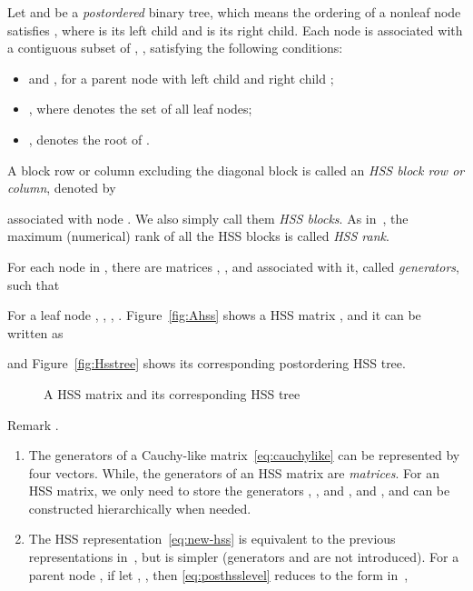 \documentclass[times]{nlaauth}
\newcounter{remark}
\newenvironment{remark}{\refstepcounter{remark}\vspace{1ex}
{\sc Remark \theremark.}\hspace{0.3em}\parindent=0pt}{\vspace{1ex}}
\begin{document}
Let  and
 be a \emph{postordered} binary tree, which means the ordering of a nonleaf node 
satisfies , where  is its left child and  is its right child.
Each node  is associated with a contiguous subset of , , satisfying the
following conditions:
\begin{itemize}
\item  and , for a parent node  with
  left child  and right child ;

  \item , where  denotes the set of all leaf nodes;

\item ,
   denotes the root of .
\end{itemize}
A block row or column excluding the diagonal block is called an \emph{HSS block row or column},
denoted by

associated with node . We also simply call them \emph{HSS blocks}.
As in~\cite{Xia-HSS-Chol}, the maximum (numerical) rank of all the HSS blocks is
called \emph{HSS rank}.

For each node  in , there are matrices , ,  and 
associated with it, called \emph{generators}, such that

For a leaf node , , ,
. Figure~\ref{fig:Ahss} shows a  HSS matrix , and
it can be written as

and Figure~\ref{fig:Hsstree} shows its corresponding postordering HSS tree.

\begin{figure}
\centering
{}
\quad
{}
\caption{A  HSS matrix and its corresponding HSS tree}
\label{fig:gnaHss}
\end{figure}

\begin{remark}
\begin{enumerate}
  \item The generators of a Cauchy-like matrix~\eqref{eq:cauchylike} can be represented by four vectors.
  While, the generators of an HSS matrix are \emph{matrices}.
  For an HSS matrix, we only need to store the generators , ,  and , and
  ,  and  can be constructed hierarchically when needed.

  \item The HSS representation~\eqref{eq:new-hss} is equivalent to the previous representations in~\cite{Hss-ulv,ChandrasekaranGu04,Xia-HSS-Chol},
   but is simpler (generators  and  are not introduced).
   For a parent node , if let , , then
   \eqref{eq:posthsslevel} reduces to the form in~\cite{Xia-HSS-Chol},
   

\end{enumerate}
\end{remark}
\end{document}
